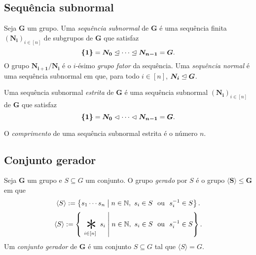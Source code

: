 \subsection{Sequência subnormal}

\begin{definition}
Seja $\bm G$ um grupo. Uma \emph{sequência subnormal} de $\bm G$ é uma sequência finita $(\bm{N_i})_{i \in [n]}$ de subgrupos de $\bm G$ que satisfaz
	\begin{equation*}
	\bm{\{1\}} = \bm{N_0} \mathrel{\unlhd} \cdots \mathrel{\unlhd} \bm{N_{n-1}} = \bm G.
	\end{equation*}
O grupo $\bm{N_{i+1}/N_i}$ é o $i$-ésimo \emph{grupo fator} da sequência.
Uma \emph{sequência normal} é uma sequência subnormal em que, para todo $i \in [n]$, $\bm{N_i} \mathrel{\unlhd} \bm G$.

Uma sequência subnormal \emph{estrita} de $\bm G$ é uma sequência subnormal $(\bm{N_i})_{i \in [n]}$ de $\bm G$ que satisfaz
	\begin{equation*}
	\bm{\{1\}} = \bm{N_0} \mathrel{\lhd} \cdots \mathrel{\lhd} \bm{N_{n-1}} = \bm G.
	\end{equation*}
	
O \emph{comprimento} de uma sequência subnormal estrita é o número $n$.
\end{definition}



\subsection{Conjunto gerador}

\begin{definition}
Seja $\bm G$ um grupo e $S \subseteq G$ um conjunto. O grupo \emph{gerado} por $S$ é o grupo $\bm{\langle S \rangle} \leq \bm G$ em que
	\begin{equation*}
	\langle S \rangle := \left\{{s_1 \cdots s_n}\;\middle\vert\;{n \in \mathbb{N},\ s_i \in S \text{\ \ ou\ \ } s_i^{-1} \in S}\right\}.
	\end{equation*}
	\begin{equation*}
	\langle S \rangle := \set{\bigopb_{i \in [n]} s_i}{n \in \N,\ s_i \in S \text{\ \ ou\ \ } s_i\inv \in S}.
	\end{equation*}
\noindent
Um \emph{conjunto gerador} de $\bm G$ é um conjunto $S \subseteq G$ tal que $\langle S \rangle = G$.
\end{definition}









